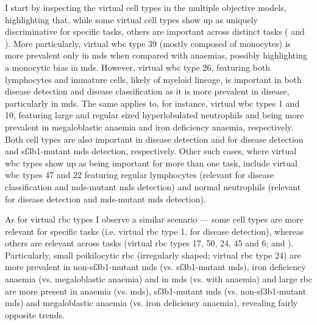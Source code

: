 I start by inspecting the virtual cell types in the multiple objective models, highlighting that, while some virtual cell types show up as uniquely discriminative for specific tasks, others are important across distinct tasks ( and ). More particularly, virtual \ac{wbc} type 39 (mostly composed of monocytes) is more prevalent only in \ac{mds} when compared with anaemias, possibly highlighting a monocytic bias in \ac{mds}. However, virtual \ac{wbc} type 26, featuring both lymphocytes and immature cells, likely of myeloid lineage, is important in both disease detection and disease classification as it is more prevalent in disease, particularly in \ac{mds}. The same applies to, for instance, virtual \ac{wbc} types 1 and 10, featuring large and regular sized hyperlobulated neutrophils and being more prevalent in megaloblastic anaemia and iron deficiency anaemia, respectively. Both cell types are also important in disease detection and for disease detection and \ac{sf3b1}-mutant \ac{mds} detection, respectively. Other such cases, where virtual \ac{wbc} types show up as being important for more than one task, include virtual \ac{wbc} types 47 and 22 featuring regular lymphocytes (relevant for disease classification and \ac{mds}-mutant \ac{mds} detection) and normal neutrophils (relevant for disease detection and \ac{mds}-mutant \ac{mds} detection). 

\begin{figure}[!ht]
    \label{fig:mile-vice-multi-objective-effects}
\end{figure}

\begin{figure}[!ht]
    \label{fig:wbc-mo-examples}
\end{figure}

As for virtual \ac{rbc} types I observe a similar scenario --- some cell types are more relevant for specific tasks (i.e. virtual \ac{rbc} type 1, for disease detection), whereas others are relevant across tasks (virtual \ac{rbc} types 17, 50, 24, 45 and 6;  and ). Particularly, small poikilocytic \ac{rbc} (irregularly shaped; virtual \ac{rbc} type 24) are more prevalent in non-\ac{sf3b1}-mutant \ac{mds} (vs. \ac{sf3b1}-mutant \ac{mds}), iron deficiency anaemia (vs. megaloblastic anaemia) and in \ac{mds} (vs. with anaemia) and large \ac{rbc} are more present in anaemia (vs. \ac{mds}), \ac{sf3b1}-mutant \ac{mds} (vs. non-\ac{sf3b1}-mutant \ac{mds}) and megaloblastic anaemia (vs. iron deficiency anaemia), revealing fairly opposite trends. 

